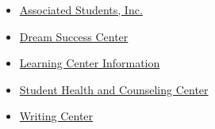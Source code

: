 \begin{itemize}
\tightlist
\item
  \href{http://fresnostateasi.org/}{Associated Students, Inc.}
\item
  \href{http://fresnostate.edu/studentaffairs/dsc/index.html}{Dream
  Success Center}
\item
  \href{http://fresnostate.edu/studentaffairs/lrc}{Learning Center
  Information}
\item
  \href{https://www.fresnostate.edu/studentaffairs/health/}{Student
  Health and Counseling Center}
\item
  \href{http://www.fresnostate.edu/artshum/writingcenter/}{Writing
  Center}
\end{itemize}
